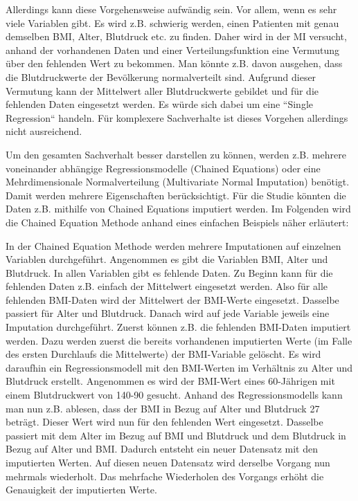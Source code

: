 Allerdings kann diese Vorgehensweise aufwändig sein. Vor allem, wenn es sehr viele Variablen gibt. Es wird z.B. 
schwierig werden, einen Patienten mit genau demselben BMI, Alter, Blutdruck etc. zu finden. Daher wird in 
der MI versucht, anhand der vorhandenen Daten und einer Verteilungsfunktion eine Vermutung über den fehlenden Wert zu 
bekommen. Man könnte z.B. davon ausgehen, dass die Blutdruckwerte der Bevölkerung normalverteilt sind. Aufgrund dieser Vermutung 
kann der Mittelwert aller Blutdruckwerte gebildet und für die fehlenden Daten eingesetzt werden. Es würde sich dabei um eine ``Single Regression`` handeln. \autocite[3]{Shrive2006}
Für komplexere Sachverhalte ist 
dieses Vorgehen allerdings nicht ausreichend. \autocite[1089]{Donders2006}

Um den gesamten Sachverhalt besser darstellen zu können, werden z.B. mehrere voneinander abhängige Regressionsmodelle 
(Chained Equations) oder eine Mehrdimensionale Normalverteilung (Multivariate Normal Imputation) benötigt. \autocite[489]{Spratt2010} Damit 
werden mehrere Eigenschaften berücksichtigt. Für die Studie könnten die Daten z.B. mithilfe von Chained Equations imputiert werden. Im Folgenden wird
die Chained Equation Methode anhand eines einfachen Beispiels näher erläutert:

In der Chained Equation Methode werden mehrere Imputationen auf einzelnen Variablen durchgeführt. Angenommen es gibt die Variablen BMI, Alter und Blutdruck. 
In allen Variablen gibt es fehlende Daten. Zu Beginn kann für die fehlenden Daten z.B. einfach der Mittelwert eingesetzt werden. Also für alle fehlenden 
BMI-Daten wird der Mittelwert der BMI-Werte eingesetzt. Dasselbe passiert für Alter und Blutdruck. Danach wird auf jede Variable jeweils eine Imputation durchgeführt. 
Zuerst können z.B. die fehlenden BMI-Daten imputiert werden. Dazu werden zuerst die bereits vorhandenen imputierten Werte (im Falle des ersten Durchlaufs die Mittelwerte)
der BMI-Variable gelöscht. Es wird daraufhin ein Regressionsmodell mit den BMI-Werten im Verhältnis zu Alter und Blutdruck erstellt. Angenommen es wird der BMI-Wert
eines 60-Jährigen mit einem Blutdruckwert von 140-90 gesucht. Anhand des Regressionsmodells kann man nun z.B. ablesen, dass der BMI in Bezug auf Alter und Blutdruck 27 beträgt.
Dieser Wert wird nun für den fehlenden Wert eingesetzt. Dasselbe passiert mit dem Alter im Bezug auf BMI und Blutdruck und dem Blutdruck in Bezug auf Alter und BMI. Dadurch
entsteht ein neuer Datensatz mit den imputierten Werten. Auf diesen neuen Datensatz wird derselbe Vorgang nun mehrmals wiederholt. \autocite[108]{Tilling2016}
Das mehrfache Wiederholen des Vorgangs erhöht die Genauigkeit der imputierten Werte.  


